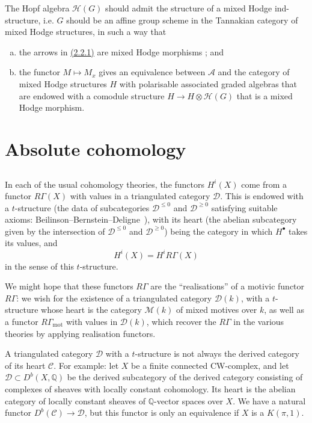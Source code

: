 \documentclass{article}
\theoremstyle{plain}
\theoremstyle{definition}
\newcommand{\scr}[1]{{\mathscr{#1}}}
\newcommand{\QQ}{\mathbb{Q}}
\newcommand{\mot}{\mathrm{mot}}
\renewcommand{\geq}{\geqslant}
\renewcommand{\leq}{\leqslant}
\begin{document}
The Hopf algebra $\scr{H}(G)$ should admit the structure of a mixed Hodge ind-structure, i.e. $G$ should be an affine group scheme in the Tannakian category of mixed Hodge structures, in such a way that
\begin{enumerate}[(a)]
  \item the arrows in \hyperref[2.2.1]{(2.2.1)} are mixed Hodge morphisms ; and
  \item the functor $M\mapsto M_x$ gives an equivalence between $\scr{A}$ and the category of mixed Hodge structures $H$ with polarisable associated graded algebras that are endowed with a comodule structure $H\to H\otimes\scr{H}(G)$ that is a mixed Hodge morphism.
\end{enumerate}


\section{Absolute cohomology}
\label{3}

\subsection{}
\label{3.1}

In each of the usual cohomology theories, the functors $H^i(X)$ come from a functor $R\Gamma(X)$ with values in a triangulated category $\scr{D}$.
This is endowed with a $t$-structure (the data of subcategories $\scr{D}^{\leq0}$ and $\scr{D}^{\geq0}$ satisfying suitable axioms: Beilinson--Bernstein--Deligne~\cite[1.3]{3}), with its heart (the abelian subcategory given by the intersection of $\scr{D}^{\leq0}$ and $\scr{D}^{\geq0}$) being the category in which $H^\bullet$ takes its values, and
\[
  H^i(X) = H^iR\Gamma(X)
\]
in the sense of this $t$-structure.

We might hope that these functors $R\Gamma$ are the ``realisations'' of a motivic functor $R\Gamma$:
we wish for the existence of a triangulated category $\scr{D}(k)$, with a $t$-structure whose heart is the category $\scr{M}(k)$ of mixed motives over $k$, as well as a functor $R\Gamma_\mot$ with values in $\scr{D}(k)$, which recover the $R\Gamma$ in the various theories by applying realisation functors.

A triangulated category $\scr{D}$ with a $t$-structure is not always the derived category of its heart $\scr{C}$.
For example: let $X$ be a finite connected CW-complex, and let $\scr{D}\subset D^b(X,\QQ)$ be the derived subcategory of the derived category consisting of complexes of sheaves with locally constant cohomology.
Its heart is the abelian category of locally constant sheaves of $\QQ$-vector spaces over $X$.
We have a natural functor $D^b(\scr{C})\to\scr{D}$, but this functor is only an equivalence if $X$ is a $K(\pi,1)$.
\end{document}
